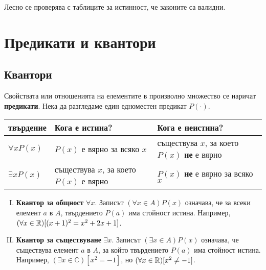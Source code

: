 Лесно се проверява с таблиците за истинност, че законите са валидни.

\section{Предикати и квантори}

\subsection*{Квантори}

Свойствата или отношенията на елементите в произволно множество се наричат {\bf предикати}.
Нека да разгледаме един едноместен предикат $P(\cdot)$.

\bigskip
\begin{tabular}{|l|p{4.2cm}|p{4.5cm}|}
  \hline
  твърдение & Кога е истина? & Кога е неистина?\\
  \hline
  $\forall x P(x)$ & $P(x)$ е вярно за всяко $x$ & съществува $x$, за което $P(x)$ {\bf не} е вярно \\
  \hline
  $\exists x P(x)$ & съществува $x$, за което $P(x)$ е вярно & $P(x)$ {\bf не} е вярно за всяко $x$\\
  \hline
\end{tabular}  
\bigskip

\begin{enumerate}[(I)]
\item 
  {\bf Квантор за общност} $\forall x$.
  Записът $(\forall x \in A) P(x)$ означава, че за всеки елемент $a$ в $A$, 
  твърдението $P(a)$ има стойност истина.
  Например, $(\forall x\in\mathbb{R})[(x+1)^2 = x^2+2x+1]$.
\item
  {\bf Квантор за съществуване} $\exists x$.
  Записът $(\exists x \in A) P(x)$ означава, че съществува елемент $a$ в $A$, 
  за който твърдението $P(a)$ има стойност истина.
  Например, $(\exists x \in\mathbb{C})[x^2 = -1]$, но $(\forall x\in\mathbb{R})[x^2 \neq -1]$.
\end{enumerate}

